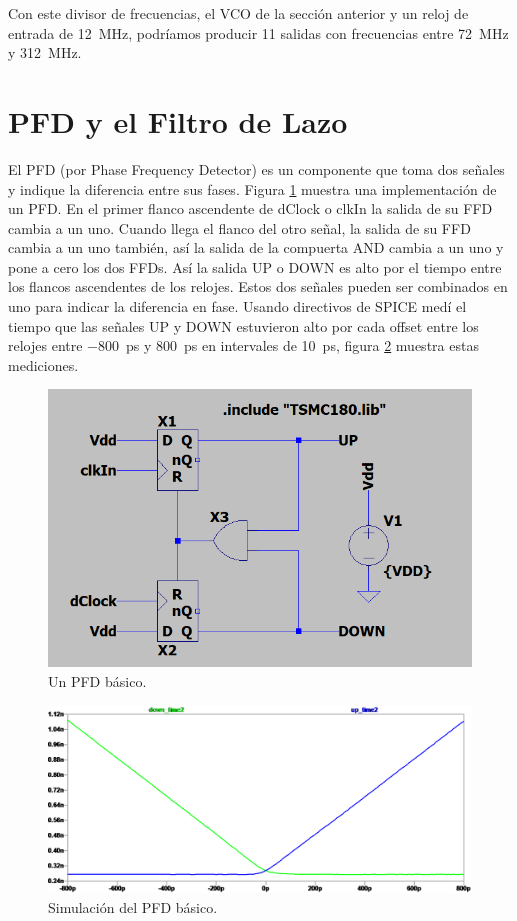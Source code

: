 \documentclass[a4paper]{article}
\begin{document}
Con este divisor de frecuencias, el VCO de la sección anterior y un reloj de entrada de \SI{12}{\mega\hertz}, podríamos producir 11 salidas con frecuencias entre \SI{72}{\mega\hertz} y \SI{312}{\mega\hertz}.

\section{PFD y el Filtro de Lazo}

El PFD (por Phase Frequency Detector) es un componente que toma dos señales y indique la diferencia entre sus fases. Figura \ref{fig:pfd_sch} muestra una implementación de un PFD. En el primer flanco ascendente de  dClock o clkIn la salida de su FFD cambia a un uno. Cuando llega el flanco del otro señal, la salida de su FFD cambia a un uno también, así la salida de la compuerta AND cambia a un uno y pone a cero los dos FFDs. Así la salida UP o DOWN es alto por el tiempo entre los flancos ascendentes de los relojes. Estos dos señales pueden ser combinados en uno para indicar la diferencia en fase. Usando directivos de SPICE medí el tiempo que las señales UP y DOWN estuvieron alto por cada offset entre los relojes entre \SI{-800}{\pico\second} y \SI{800}{\pico\second} en intervales de \SI{10}{\pico\second}, figura \ref{fig:pfd_sim} muestra estas mediciones.

\begin{figure}[!htb]
\centering
\includegraphics[scale=0.4]{./img/pfd_sch}
\caption{Un PFD básico.}
\label{fig:pfd_sch}
\end{figure}

\begin{figure}[!htb]
\centering
\includegraphics[scale=0.4]{./img/pfd_sim}
\caption{Simulación del PFD básico.}
\label{fig:pfd_sim}
\end{figure}
\end{document}
